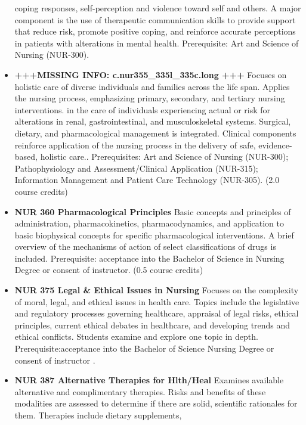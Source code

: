 \documentclass[
  letterpaper,
]{scrbook}
\begin{document}
\begin{itemize}
  coping responses, self-perception and violence toward self and others.
  A major component is the use of therapeutic communication skills to
  provide support that reduce risk, promote positive coping, and
  reinforce accurate perceptions in patients with alterations in mental
  health. Prerequisite: Art and Science of Nursing (NUR-300).\\
\item
  \textbf{+++MISSING INFO: c.nur355\_335l\_335c.long +++} Focuses on
  holistic care of diverse individuals and families across the life
  span. Applies the nursing process, emphasizing primary, secondary, and
  tertiary nursing interventions. in the care of individuals
  experiencing actual or risk for alterations in renal,
  gastrointestinal, and musculoskeletal systems. Surgical, dietary, and
  pharmacological management is integrated. Clinical components
  reinforce application of the nursing process in the delivery of safe,
  evidence-based, holistic care.. Prerequisites: Art and Science of
  Nursing (NUR-300); Pathophysiology and Assessment/Clinical Application
  (NUR-315); Information Management and Patient Care Technology
  (NUR-305). (2.0 course credits)
\item
  \textbf{NUR 360 Pharmacological Principles} Basic concepts and
  principles of administration, pharmacokinetics, pharmacodynamics, and
  application to basic biophysical concepts for specific pharmacological
  interventions. A brief overview of the mechanisms of action of select
  classifications of drugs is included. Prerequisite: acceptance into
  the Bachelor of Science in Nursing Degree or consent of instructor.
  (0.5 course credits)\\
\item
  \textbf{NUR 375 Legal \& Ethical Issues in Nursing} Focuses on the
  complexity of moral, legal, and ethical issues in health care. Topics
  include the legislative and regulatory processes governing healthcare,
  appraisal of legal risks, ethical principles, current ethical debates
  in healthcare, and developing trends and ethical conflicts. Students
  examine and explore one topic in depth. Prerequisite:acceptance into
  the Bachelor of Science Nursing Degree or consent of instructor .
\item
  \textbf{NUR 387 Alternative Therapies for Hlth/Heal} Examines
  available alternative and complimentary therapies. Risks and benefits
  of these modalities are assessed to determine if there are solid,
  scientific rationales for them. Therapies include dietary supplements,

\end{itemize}
\end{document}
